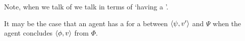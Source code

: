 \begin{note}



\end{note}

\begin{note}
  Note, when we talk of  we talk in terms of `having a '.

  It may be the case that an agent has a \wit{} for a \ros{} between \(\langle \psi, v' \rangle\) and \(\Psi\) when the agent concludes \(\langle \phi, v \rangle\) from \(\Phi\).


  \end{note}

\section{\supportII{}}
\label{cha:ros:II}

